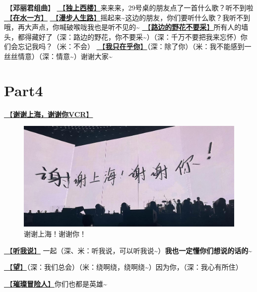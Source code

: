 \documentclass[]{ctexbook}
\begin{document}
🎵【\textbf{邓丽君组曲}】
\hyperref[one-in-the-building]{🎵【\textbf{独上西楼}】}来来来，29号桌的朋友点了一首什么歌？听不到啦
\hyperref[on-the-water-side]{🎵【\textbf{在水一方}】}
\hyperref[walk-the-road-of-life]{🎵【\textbf{漫步人生路}】}摇起来\textasciitilde 这边的朋友，你们要听什么歌？我听不到哦，再大声点，你喊破喉咙我也是听不见的\textasciitilde{}
\hyperref[only-with-me]{🎵【\textbf{路边的野花不要采}】}所有人的墙头，都得藏好了（深：路边的野花，你不要采\textasciitilde）（深：千万不要把我来忘怀）你们会忘记我吗？（米：不会）
\hyperref[only-you]{🎵【\textbf{我只在乎你}】}（深：除了你）（米：我不能感到一丝丝情意）（深：情意\textasciitilde）谢谢大家\textasciitilde{}

\newpage

\section{Part4}\label{shanghai-20240518-part4}

\hyperref[thank-you-vcr]{🎥【\textbf{谢谢上海，谢谢你VCR}】}

\begin{figure}

{\centering \includegraphics[width=400pt]{img/shanghai20240518/thank-shanghai} 

}

\caption{谢谢上海！谢谢你！}\label{fig:unnamed-chunk-35}
\end{figure}

\hyperref[listen-to-me]{🎵【\textbf{听我说}】} 一起（深、米：听我说，可以听我说\textasciitilde）\textbf{我也一定懂你们想说的话的\textasciitilde{}}

\hyperref[hope]{🎵【\textbf{望}】}（深：我们总会）（米：绕啊绕，绕啊绕\textasciitilde）因为你，（深：我心有所住）

\hyperref[adventurers]{🎵【\textbf{璀璨冒险人}】}你们也都是英雄\textasciitilde{}
\end{document}
